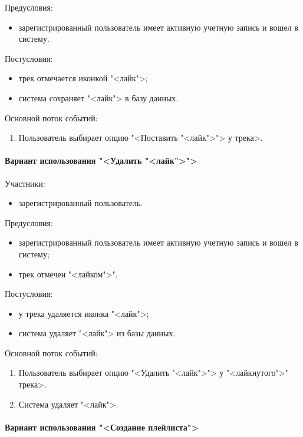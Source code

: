 Предусловия:
\begin{itemize}
	\item зарегистрированный пользователь имеет активную учетную запись и вошел в систему.
\end{itemize}

Постусловия:
\begin{itemize}
	\item трек отмечается иконкой "<лайк">;
	\item система сохраняет "<лайк"> в базу данных.
\end{itemize}

Основной поток событий:
\begin{enumerate}
	\item Пользователь выбирает опцию "<Поставить "<лайк">"> у трека>.
\end{enumerate}

\paragraph{Вариант использования "<Удалить "<лайк">">}

Участники:
\begin{itemize}
	\item зарегистрированный пользователь.
\end{itemize}

Предусловия:
\begin{itemize}
	\item зарегистрированный пользователь имеет активную учетную запись и вошел в систему;
	\item трек отмечен "<лайком">".
\end{itemize}

Постусловия:
\begin{itemize}
	\item у трека удаляется иконка "<лайк">;
	\item система удаляет "<лайк"> из базы данных.
\end{itemize}

Основной поток событий:
\begin{enumerate}
	\item Пользователь выбирает опцию "<Удалить "<лайк">"> у "<лайкнутого">" трека>.
	\item Система удаляет "<лайк">.
\end{enumerate}

\paragraph{Вариант использования "<Создание плейлиста">}

